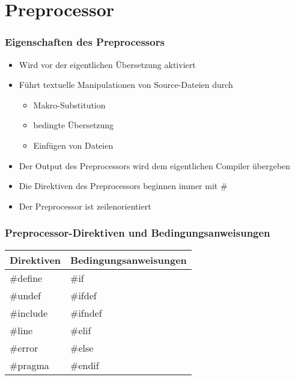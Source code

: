 
\part{Preprocessor}

\begin{multicols}{2}
\section{Eigenschaften des Preprocessors}
\begin{itemize}
	\item Wird vor der eigentlichen Übersetzung aktiviert
	\item Führt textuelle Manipulationen von Source-Dateien durch
	\begin{itemize}
		\item Makro-Substitution
		\item bedingte Übersetzung
		\item Einfügen von Dateien
	\end{itemize}
	\item Der Output des Preprocessors wird dem eigentlichen Compiler übergeben
	\item Die Direktiven des Preprocessors beginnen immer mit \#
	\item Der Preprocessor ist zeilenorientiert
\end{itemize}
\vfill\null
\columnbreak
\section{Preprocessor-Direktiven und Bedingungsanweisungen}
\centering
\begin{tabularx}{0.5\textwidth}{|X|X|}
	\hline
	\textbf{Direktiven} & \textbf{Bedingungsanweisungen}\\
	\hline
	\#define & \#if\\
	\hline
	\#undef & \#ifdef\\
	\hline
	\#include & \#ifndef\\
	\hline
	\#line & \#elif\\
	\hline
	\#error & \#else\\
	\hline
	\#pragma & \#endif\\
	\hline
\end{tabularx}
\flushleft
\end{multicols}

